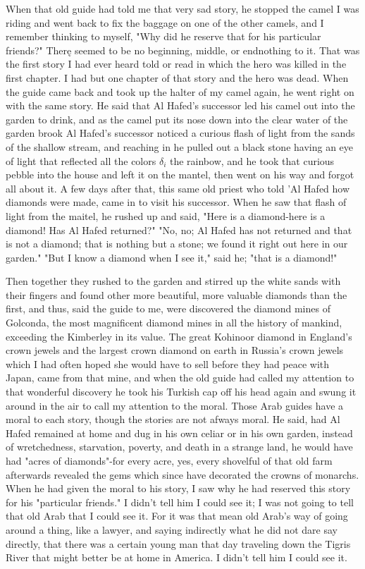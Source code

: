 \documentclass[10pt]{article}
\begin{document}
When that old guide had told me that very sad story, he stopped the camel I was riding and went back to fix the baggage on one of the other camels, and I remember thinking to myself, "Why did he reserve that for his particular friends?" Therę seemed to be no beginning, middle, or endnothing to it. That was the first story I had ever heard told or read in which the hero was killed in the first chapter. I had but one chapter of that story and the hero was dead. When the guide came back and took up the halter of my camel again, he went right on with the same story. He said that Al Hafed's successor led his camel out into the garden to drink, and as the camel put its nose down into the clear water of the garden brook Al Hafed's successor noticed a curious flash of light from the sands of the shallow stream, and reaching in he pulled out a black stone having an eye\\
of light that reflected all the colors $\delta_{i}$ the rainbow, and he took that curious pebble into the house and left it on the mantel, then went on his way and forgot all about it. A few days after that, this same old priest who told 'Al Hafed how diamonds were made, came in to visit his successor. When he saw that flash of light from the maitel, he rushed up and said, "Here is a diamond-here is a diamond! Has Al Hafed returned?" "No, no; Al Hafed has not returned and that is not a diamond; that is nothing but a stone; we found it right out here in our garden." "But I know a diamond when I see it," said he; "that is a diamond!"

Then together they rushed to the garden and stirred up the white sands with their fingers and found other more beautiful, more valuable diamonds than the first, and thus, said the guide to me, were discovered the diamond mines of Golconda, the most magnificent diamond mines in all the history of mankind, exceeding the Kimberley in its value. The great Kohinoor diamond in England's crown jewels and the largest crown diamond on earth in Russia's crown jewels which I had often hoped she would have to sell before they had peace with Japan, came from that mine, and when the old guide had called my attention to that wonderful discovery he took his Turkish cap off his head again and swung it around in the air to call my attention to the moral. Those Arab guides have a moral to each story, though the stories are not afways moral. He said, had Al Hafed remained at home and dug in his own celiar or in his own garden, instead of wretchedness, starvation, poverty, and death in a strange land, he would have had "acres of diamonds"-for every acre, yes, every shovelful of that old farm afterwards revealed the gems which since have decorated the crowns of monarchs. When he had given the moral to his story, I saw why he had reserved this story for his "particular friends." I didn't tell him I could see it; I was not going to tell that old Arab that I could see it. For it was that mean old Arab's way of going\\
around a thing, like a lawyer, and saying indirectly what he did not dare say directly, that there was a certain young man that day traveling down the Tigris River that might better be at home in America. I didn't tell him I could see it.
\end{document}
